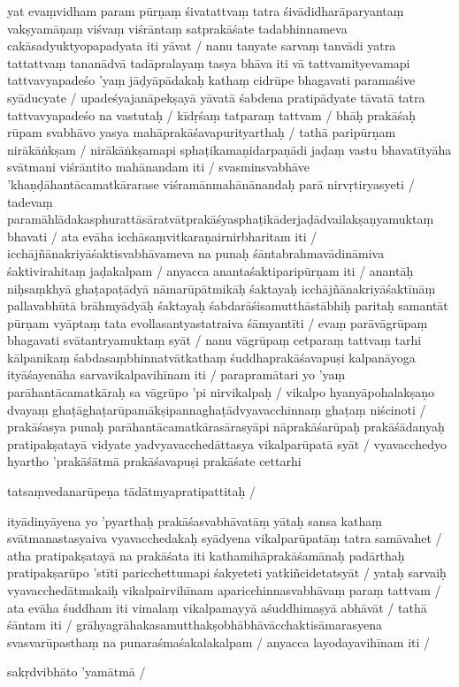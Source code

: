 yat evaṃvidham param pūrṇaṃ śivatattvaṃ tatra śivādidharāparyantaṃ vakṣyamāṇaṃ viśvaṃ viśrāntaṃ satprakāśate tadabhinnameva cakāsadyuktyopapadyata iti yāvat  / nanu tanyate sarvaṃ tanvādi yatra tattattvaṃ tananādvā tadāpralayaṃ tasya bhāva iti vā tattvamityevamapi tattvavyapadeśo 'yaṃ jāḍyāpādakaḥ kathaṃ cidrūpe bhagavati paramaśive syāducyate  / upadeśyajanāpekṣayā yāvatā śabdena pratipādyate tāvatā tatra tattvavyapadeśo na vastutaḥ  / kīdṛśaṃ tatparaṃ tattvam  / bhāḥ prakāśaḥ rūpam svabhāvo yasya mahāprakāśavapurityarthaḥ  / tathā paripūrṇam nirākāṅkṣam  / nirākāṅkṣamapi sphaṭikamaṇidarpaṇādi jaḍaṃ vastu bhavatītyāha svātmani viśrāntito mahānandam iti  / svasminsvabhāve 'khaṇḍāhantācamatkārarase viśramānmahānānandaḥ parā nirvṛtiryasyeti  / tadevaṃ paramāhlādakasphurattāsāratvātprakāśyasphaṭikāderjaḍādvailakṣaṇyamuktaṃ bhavati  / ata evāha icchāsaṃvitkaraṇairnirbharitam iti  / icchājñānakriyāśaktisvabhāvameva na punaḥ śāntabrahmavādināmiva śaktivirahitaṃ jaḍakalpam  / anyacca anantaśaktiparipūrṇam iti  / anantāḥ niḥsaṃkhyā ghaṭapaṭādyā nāmarūpātmikāḥ śaktayaḥ icchājñānakriyāśaktīnāṃ pallavabhūtā brāhmyādyāḥ śaktayaḥ śabdarāśisamutthāstābhiḥ paritaḥ samantāt pūrṇam vyāptaṃ tata evollasantyastatraiva śāmyantīti  / evaṃ parāvāgrūpaṃ bhagavati svātantryamuktaṃ syāt  / nanu vāgrūpaṃ cetparaṃ tattvaṃ tarhi kālpanikaṃ śabdasaṃbhinnatvātkathaṃ śuddhaprakāśavapuṣi kalpanāyoga ityāśayenāha sarvavikalpavihīnam iti  / parapramātari yo 'yaṃ parāhantācamatkāraḥ sa vāgrūpo 'pi nirvikalpaḥ  / vikalpo hyanyāpohalakṣaṇo dvayaṃ ghaṭāghaṭarūpamākṣipannaghaṭādvyavacchinnaṃ ghaṭaṃ niścinoti  / prakāśasya punaḥ parāhantācamatkārasārasyāpi nāprakāśarūpaḥ prakāśādanyaḥ pratipakṣatayā vidyate yadvyavacchedāttasya vikalparūpatā syāt  / vyavacchedyo hyartho 'prakāśātmā prakāśavapuṣi prakāśate cettarhi

tatsaṃvedanarūpeṇa tādātmyapratipattitaḥ  /

ityādinyāyena yo 'pyarthaḥ prakāśasvabhāvatāṃ yātaḥ sansa kathaṃ svātmanastasyaiva vyavacchedakaḥ syādyena vikalparūpatāṃ tatra samāvahet  / atha pratipakṣatayā na prakāśata iti kathamihāprakāśamānaḥ padārthaḥ pratipakṣarūpo 'stīti paricchettumapi śakyeteti yatkiñcidetatsyāt  / yataḥ sarvaiḥ vyavacchedātmakaiḥ vikalpairvihīnam aparicchinnasvabhāvaṃ paraṃ tattvam  / ata evāha śuddham iti vimalaṃ vikalpamayyā aśuddhimaṣyā abhāvāt  / tathā śāntam iti  / grāhyagrāhakasamutthakṣobhābhāvācchaktisāmarasyena svasvarūpasthaṃ na punaraśmaśakalakalpam  / anyacca layodayavihīnam iti  /

sakṛdvibhāto 'yamātmā  /

